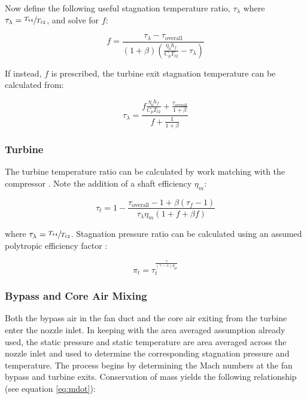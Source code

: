 \documentclass{article}
\begin{document}
Now define the following useful stagnation temperature ratio, $\tau_{\lambda}$ where $\tau_{\lambda} = \sfrac{T_{t4}}{T_{t2}}$, and solve for $f$:

\begin{equation*}
f = \frac{\tau_{\lambda} - \tau_{\textrm{overall}}}{ \left( 1 + \beta \right) \left( \frac{ \eta_b h_f}{C_p T_{t2}} - \tau_{\lambda} \right) }
\end{equation*}

If instead, $f$ is prescribed, the turbine exit stagnation temperature can be calculated from:

\begin{equation*}
\tau_{\lambda} = \frac{ f \frac{\eta_b h_f}{C_p T_{t2}} + \frac{\tau_{\textrm{overall}}}{1 + \beta}}{f + \frac{1}{1 + \beta}}
\end{equation*}

\subsubsection{Turbine}
The turbine temperature ratio can be calculated by work matching with the compressor \cite{cantwell283}. Note the addition of a shaft efficiency $\eta_m$:

\begin{equation*}
\tau_t = 1 - \frac{\tau_{\textrm{overall}} - 1 + \beta \left( \tau_f - 1 \right) }{\tau_{\lambda} \eta_m \left( 1 + f + \beta f \right)}
\end{equation*}

where $\tau_{\lambda} = \sfrac{T_{t4}}{T_{t2}}$. Stagnation pressure ratio can be calculated using an assumed polytropic efficiency factor \cite{cantwell283}:

\begin{equation*}
\pi_t = \tau_t^{\frac{\gamma}{(\gamma - 1) \eta_{pt}}}
\end{equation*}

\subsubsection{Bypass and Core Air Mixing}
\label{sec:mixing}

Both the bypass air in the fan duct and the core air exiting from the turbine enter the nozzle inlet. In keeping with the area averaged assumption already used, the static pressure and static temperature are area averaged across the nozzle inlet and used to determine the corresponding stagnation pressure and temperature. The process begins by determining the Mach numbers at the fan bypass and turbine exits. Conservation of mass yields the following relationship (see equation \ref{eq:mdot}):
\end{document}
